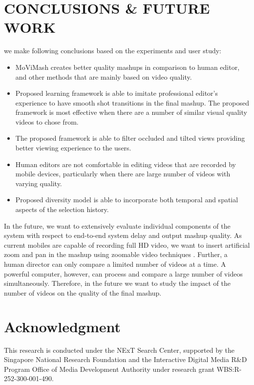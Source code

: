 \documentclass{sig-alternate}
\begin{document}
    \section{CONCLUSIONS \& FUTURE WORK}
    we make following conclusions based on the experiments and user study:
    \begin{itemize}
        \item MoViMash creates better quality mashups in comparison to human editor, and other methods that are mainly based on video quality.
        \item Proposed learning framework is able to imitate professional editor’s experience to have smooth shot transitions in the final mashup. The proposed framework is most effective when there are a number of similar visual quality videos to chose from.
        \item The proposed framework is able to filter occluded and tilted views providing better viewing experience to the users.
        \item Human editors are not comfortable in editing videos that are recorded by mobile devices, particularly when there are large number of videos with varying quality.
        \item Proposed diversity model is able to incorporate both temporal and spatial aspects of the selection history.
    \end{itemize}
    In the future, we want to extensively evaluate individual components of the system with respect to end-to-end system delay and output mashup quality. As current mobiles are capable of recording full HD video, we want to insert artificial zoom and pan in the mashup using zoomable video techniques \cite{11}. Further, a human director can only compare a limited number of videos at a time. A powerful computer, however, can process and compare a large number of videos simultaneously. Therefore, in the future we want to study the impact of the number of videos on the quality of the final mashup.
    
    \section*{Acknowledgment}
    This research is conducted under the NExT Search Center, supported by the Singapore National Research Foundation and the Interactive Digital Media R\&D Program Office of Media Development Authority under research grant WBS:R-252-300-001-490.
    
    
     
    
\end{document}
